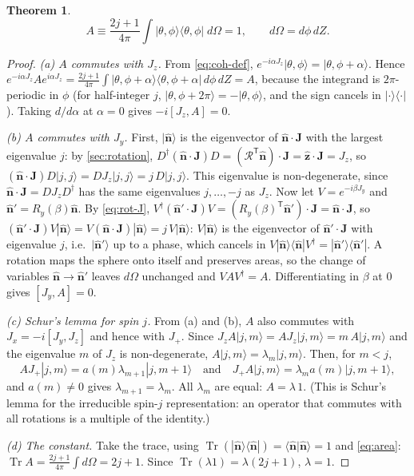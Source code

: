 \documentclass[11pt,a4paper]{article}
\newtheorem*{theorem*}{Theorem}
\newcommand{\vJ}{\bm{J}}
\newcommand{\vn}{\hat{\bm n}}
\newcommand{\Tr}{\operatorname{Tr}}
\begin{document}
\begin{theorem*}
\begin{equation}\label{eq:resolution}
  A \equiv \frac{2j+1}{4\pi}\int |\theta,\phi\rangle\langle\theta,\phi|\;d\Omega = 1 ,\qquad d\Omega = d\phi\,dZ .
\end{equation}
\end{theorem*}
\begin{proof}
\emph{(a) $A$ commutes with $J_z$.} From \eqref{eq:coh-def}, $e^{-i\alpha J_z}|\theta,\phi\rangle = |\theta,\phi+\alpha
\rangle$. Hence $e^{-i\alpha J_z}Ae^{i\alpha J_z} = \frac{2j+1}{4\pi}\int|\theta,\phi+\alpha\rangle\langle\theta,
\phi+\alpha|\,d\phi\,dZ = A$, because the integrand is $2\pi$-periodic in $\phi$ (for half-integer $j$,
$|\theta,\phi+2\pi\rangle = -|\theta,\phi\rangle$, and the sign cancels in $|\cdot\rangle\langle\cdot|$). Taking
$d/d\alpha$ at $\alpha = 0$ gives $-i[J_z,A] = 0$.

\emph{(b) $A$ commutes with $J_y$.} First, $|\vn\rangle$ is the eigenvector of $\vn\cdot\vJ$ with the largest
eigenvalue $j$: by \cref{sec:rotation}, $D^\dagger(\vn\cdot\vJ)D = (\mathcal R^{\mathsf T}\vn)\cdot\vJ = \hat{\bm z}
\cdot\vJ = J_z$, so $(\vn\cdot\vJ)D|j,j\rangle = DJ_z|j,j\rangle = j\,D|j,j\rangle$. This eigenvalue is
non-degenerate, since $\vn\cdot\vJ = DJ_zD^\dagger$ has the same eigenvalues $j,\dots,-j$ as $J_z$. Now let
$V = e^{-i\beta J_y}$ and $\vn' = R_y(\beta)\vn$. By \eqref{eq:rot-J}, $V^\dagger(\vn'\cdot\vJ)V = (R_y(\beta)^{\mathsf
T}\vn')\cdot\vJ = \vn\cdot\vJ$, so $(\vn'\cdot\vJ)V|\vn\rangle = V(\vn\cdot\vJ)|\vn\rangle = j\,V|\vn\rangle$: $V|\vn
\rangle$ is the eigenvector of $\vn'\cdot\vJ$ with eigenvalue $j$, i.e.\ $|\vn'\rangle$ up to a phase, which cancels in
$V|\vn\rangle\langle\vn|V^\dagger = |\vn'\rangle\langle\vn'|$. A rotation maps the sphere onto itself and preserves
areas, so the change of variables $\vn\to\vn'$ leaves $d\Omega$ unchanged and $VAV^\dagger = A$. Differentiating in
$\beta$ at $0$ gives $[J_y,A] = 0$.

\emph{(c) Schur's lemma for spin $j$.} From (a) and (b), $A$ also commutes with $J_x = -i[J_y,J_z]$ and hence with
$J_+$. Since $J_zA|j,m\rangle = AJ_z|j,m\rangle = m\,A|j,m\rangle$ and the eigenvalue $m$ of $J_z$ is non-degenerate,
$A|j,m\rangle = \lambda_m|j,m\rangle$. Then, for $m<j$,
\begin{equation*}
  AJ_+|j,m\rangle = a(m)\lambda_{m+1}|j,m+1\rangle \quad\text{and}\quad J_+A|j,m\rangle = \lambda_m a(m)|j,m+1\rangle ,
\end{equation*}
and $a(m)\neq0$ gives $\lambda_{m+1} = \lambda_m$. All $\lambda_m$ are equal: $A = \lambda\,1$. (This is Schur's lemma
for the irreducible spin-$j$ representation: an operator that commutes with all rotations is a multiple of the
identity.)

\emph{(d) The constant.} Take the trace, using $\Tr(|\vn\rangle\langle\vn|) = \langle\vn|\vn\rangle = 1$ and
\eqref{eq:area}: $\Tr A = \frac{2j+1}{4\pi}\int d\Omega = 2j+1$. Since $\Tr(\lambda1) = \lambda(2j+1)$, $\lambda = 1$.
\end{proof}
\end{document}
